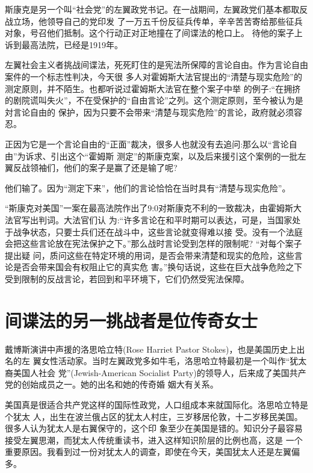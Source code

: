 \documentclass[10pt]{article}
\begin{document}
{斯康克是另一个叫``社会党''的左翼政党书记。在一战期间，左翼政党们基本都取反战立场，他领导自己的党印发
了一万五千份反征兵传单，辛辛苦苦寄给那些征兵对象，号召他们抵制。这个行动正对正地撞在了间谍法的枪口上。
待他的案子上诉到最高法院，已经是1919年。

左翼社会主义者挑战间谍法，死死盯住的是宪法所保障的言论自由。作为言论自由案件的一个标志性判决，今天很
多人对霍姆斯大法官提出的``清楚与现实危险''的测定原则，并不陌生。也都听说过霍姆斯大法官在整个案子中举
的例子:``在拥挤的剧院谎叫失火''，不在受保护的``自由言论''之列。这个测定原则，至今被认为是対言论自由的
保护，因为只要不会带来``清楚与现实危险''的言论，政府就必须容忍。

正因为它是一个言论自由的``正面''裁决，很多人也就没有去追问:那么以``言论自由''为诉求、引出这个``霍姆斯
测定''的斯康克案，以及后来援引这个案例的一批左翼反战领袖们，他们的案子是赢了还是输了呢?

他们输了。因为``测定下来''，他们的言论恰恰在当时具有``清楚与现实危险''。

``斯康克对美国''一案在最高法院作出了9:0对斯康克不利的一致裁决，由霍姆斯大法官写出判词。大法官们认
为:``许多言论在和平时期可以表达，可是，当国家处于战争状态，只要士兵们还在战斗中，这些言论就变得难以接
受。没有一个法庭会把这些言论放在宪法保护之下。''那么战时言论受到怎样的限制呢? ``对每个案子提出疑
问，质问这些在特定环境的用词，是否会带来清楚和现实的危险，这些言论是否会带来国会有权阻止它的真实危
害。''换句话说，这些在巨大战争危险之下受到限制的反战言论，若回到和平环境下，它们仍然受宪法保障。


\pagebreak
\section{间谍法的另一挑战者是位传奇女士}

戴博斯演讲中声援的洛思\textperiodcentered 哈立特(Rose Harriet Pastor Stokes)，也是美国历史上出名的左
翼女性活动家。当时左翼政党多如牛毛，洛思\textperiodcentered 哈立特最初是一个叫作``犹太裔美国人社会
党''(Jewish-American Socialist Party)的领导人，后来成了美国共产党的创始成员之一。她的出名和她的传奇婚
姻大有关系。

美国真是很适合共产党这样的国际性政党，人口组成本来就国际化。洛思\textperiodcentered 哈立特是个犹太
人，出生在波兰俄占区的犹太人村庄，三岁移居伦敦，十二岁移民美国。很多人认为犹太人是右翼保守的，这个印
象至少在美国是错的。知识分子最容易接受左翼思潮，而犹太人传统重读书，进入这样知识阶层的比例也高，这是
一个重要原因。我看到过一份对犹太人的调查，即使在今天，美国犹太人还是左翼偏多。

}
\end{document}
